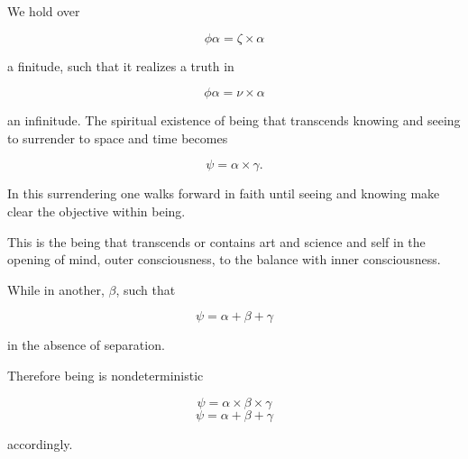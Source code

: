 

We hold over

$$
 \phi\alpha = \zeta \times \alpha
$$

a finitude, such that it realizes a truth in

$$
 \phi\alpha = \nu \times \alpha
$$

an infinitude.  The spiritual existence of being that transcends
knowing and seeing to surrender to space and time becomes

$$
 \psi = \alpha \times \gamma.
$$

In this surrendering one walks forward in faith until seeing and
knowing make clear the objective within being.

This is the being that transcends or contains art and science and self
in the opening of mind, outer consciousness, to the balance with inner
consciousness.

While in another, $\beta$, such that

$$
 \psi = \alpha + \beta + \gamma
$$

in the absence of separation.

Therefore being is nondeterministic

$$\psi = \alpha \times \beta \times \gamma$$
$$\psi = \alpha + \beta + \gamma$$

accordingly.


\bye
